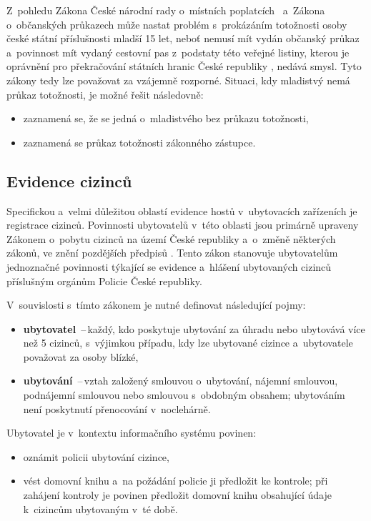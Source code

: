 Z~pohledu Zákona České národní rady o~místních poplatcích~\cite{cz-1990-565} a~Zákona o~občanských průkazech \cite{cz-2021-269} může nastat problém s~prokázáním totožnosti osoby české státní příslušnosti mladší 15 let, neboť nemusí mít vydán občanský průkaz \cite[\S~3(1)]{cz-2021-269} a~povinnost mít vydaný cestovní pas z~podstaty této veřejné listiny, kterou je oprávnění pro překračování státních hranic České republiky \cite[\S~2(1)]{cz-1999-329}, nedává smysl.
Tyto zákony tedy lze považovat za vzájemně rozporné.
Situaci, kdy mladistvý nemá průkaz totožnosti, je možné řešit následovně:
\begin{itemize}
    \item zaznamená se, že se jedná o~mladistvého bez průkazu totožnosti,
    \item zaznamená se průkaz totožnosti zákonného zástupce.
\end{itemize}

\subsection{Evidence cizinců}
Specifickou a~velmi důležitou oblastí evidence hostů v~ubytovacích zařízeních je registrace cizinců.
Povinnosti ubytovatelů v~této oblasti jsou primárně upraveny Zákonem o~pobytu cizinců na území České republiky a~o~změně některých zákonů, ve znění pozdějších předpisů \cite{cz-1999-326}.
Tento zákon stanovuje ubytovatelům jednoznačné povinnosti týkající se evidence a~hlášení ubytovaných cizinců příslušným orgánům Policie České republiky.

\vspace{8px} \noindent
V~souvislosti s~tímto zákonem je nutné definovat následující pojmy:
\begin{itemize}
    \item \textbf{ubytovatel} \cite[\S~99(1)]{cz-1999-326}\,--\,každý, kdo poskytuje ubytování za úhradu nebo ubytovává více než 5 cizinců, s~výjimkou případu, kdy lze ubytované cizince a~ubytovatele považovat za osoby blízké,
    \item \textbf{ubytování} \cite[\S~99(2)]{cz-1999-326}\,--\,vztah založený smlouvou o~ubytování, nájemní smlouvou, podnájemní smlouvou nebo smlouvou s~obdobným obsahem; ubytováním není poskytnutí přenocování v~noclehárně.
\end{itemize}

\vspace{8px} \noindent
\begin{samepage}
Ubytovatel je v~kontextu informačního systému povinen:
\begin{itemize}
    \item oznámit policii ubytování cizince,
    \item vést domovní knihu a~na požádání policie ji předložit ke kontrole; při zahájení kontroly je povinen předložit domovní knihu obsahující údaje k~cizincům ubytovaným v~té době.
\end{itemize}
\end{samepage}

